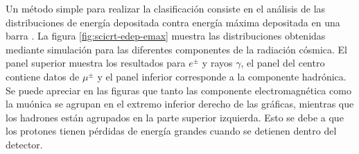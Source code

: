 Un método simple para realizar la clasificación consiste en el análisis de las distribuciones de energía depositada contra energía máxima depositada en una barra \cite{nagaiphd,sasaiphd}. La figura \ref{fig:scicrt-edep-emax} muestra las distribuciones obtenidas mediante simulación para las diferentes componentes de la radiación cósmica. El panel superior muestra los resultados para $e^{\pm}$ y rayos $\gamma$, el panel del centro contiene datos de $\mu^{\pm}$ y el panel inferior corresponde a la componente hadrónica. Se puede apreciar en las figuras que tanto las componente electromagnética como la muónica se agrupan en el extremo inferior derecho de las gráficas, mientras que los hadrones están agrupados en la parte superior izquierda. Esto se debe a que los protones tienen pérdidas de energía grandes cuando se detienen dentro del detector.

